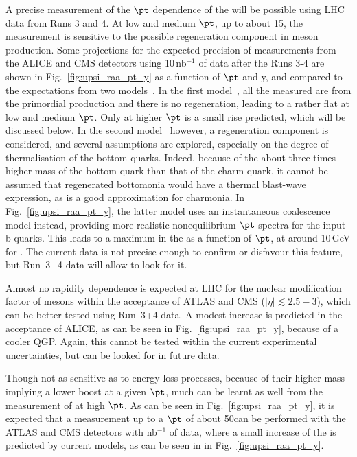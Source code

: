 \documentclass[../report.tex]{subfiles}
\begin{document}
A precise measurement of the $\pt$ dependence of the  \raa will be possible using LHC data from Runs 3 and 4. At low and medium $\pt$, up to about 15\UGeV, the measurement is
sensitive to the possible regeneration component in \PGU meson production. Some projections for the expected precision of \PGU measurements from the ALICE and CMS detectors
using 10\,nb$^{-1}$ of data after the Runs 3-4 are shown in Fig.~\ref{fig:upsi_raa_pt_y} as a function of $\pt$ and y, and compared to the expectations from two 
models~\cite{Krouppa:2017jlg,Du:2017qkv}. In the first model~\cite{Krouppa:2017jlg}, all the measured \PGU are from the primordial production and there is no regeneration, leading
to a rather flat \raa at low and medium $\pt$. Only at higher $\pt$ is a small rise predicted, which will be discussed below. In the second model~\cite{Du:2017qkv} however, a regeneration
component is considered, and several assumptions are explored, especially on the degree of thermalisation of the bottom quarks. Indeed, because of the about three times higher mass of
the bottom quark than that of the charm quark, it cannot be assumed that regenerated bottomonia would have a thermal blast-wave expression, as is a good approximation for charmonia.
In Fig.~\ref{fig:upsi_raa_pt_y}, the latter model uses an instantaneous coalescence model instead, providing more realistic nonequilibrium $\pt$ spectra for the input b quarks. 
This leads to a maximum in the \raa as a function of $\pt$, at around 10\,GeV for . The current data is not precise enough to confirm or disfavour this feature, but Run~3+4 
data will allow to look for it.

Almost no rapidity dependence is expected at LHC for the nuclear modification factor of \PGU mesons within the acceptance of ATLAS and CMS ($|\eta|\lesssim 2.5-3$), which can be better
tested using Run~3+4 data. A modest increase is predicted in the acceptance of ALICE, as can be seen in Fig.~\ref{fig:upsi_raa_pt_y}, because of a cooler QGP. Again, this cannot be tested
within the current experimental uncertainties, but can be looked for in future data.

Though not as sensitive as \PJgy to energy loss processes, because of their higher mass implying a lower boost at a given $\pt$, much can be learnt as well from the measurement of
 at high $\pt$. As can be seen in Fig.~\ref{fig:upsi_raa_pt_y}, it is expected that a measurement up to a $\pt$ of about 50\UGeV can be performed with the ATLAS and CMS detectors with
\unit[10]{nb}$^{-1}$ of data, where a small increase of the \raa is predicted by current models, as can be seen in in Fig.~\ref{fig:upsi_raa_pt_y}.
\end{document}
